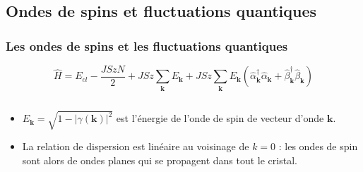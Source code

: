 \documentclass[xcolor=dvipsnames]{beamer}
\newcommand{\h}{\ensuremath{\hat{H}}\xspace}
\newcommand{\ond}{\ensuremath{\mathbf{k}\xspace}}
\newcommand{\gam}{\gamma(\ond{})}
\newcommand{\alcre}{\hat{\alpha}^\dagger_{\ond}}
\newcommand{\alan}{\hat{\alpha}_{\ond}}
\newcommand{\betcre}{\hat{\beta}^\dagger_{\ond}}
\newcommand{\betan}{\hat{\beta}_{\ond}}
\newcommand{\1}{\ensuremath{\ket{\om_1\bom_1}}\xspace}
\newcommand{\2}{\ensuremath{\ket{\om_2\bom_2}}\xspace}
\begin{document}
\subsection{Ondes de spins et fluctuations quantiques}
\begin{frame}
\frametitle{Les ondes de spins et les fluctuations quantiques}
%

\[
	\h=E_{cl}-\frac{JSzN}{2}+JSz\sum_{\ond}E_{\ond}+JSz\sum_{\ond}E_{\ond}(\alcre\alan+\betcre\betan)
\]
\begin{columns}[t]
  \begin{column}{5cm}
\begin{itemize}
\item $E_{\ond}=\sqrt{1-|\gam|^2}$ est l'énergie de l'onde de spin de vecteur d'onde $\mathbf{k}$.
\item La relation de dispersion est linéaire au voisinage de $k=0$ : les ondes de spin sont alors de ondes planes qui se propagent dans tout le cristal.
\end{itemize}
  \end{column}
  

\end{columns}
\end{frame}
\end{document}

